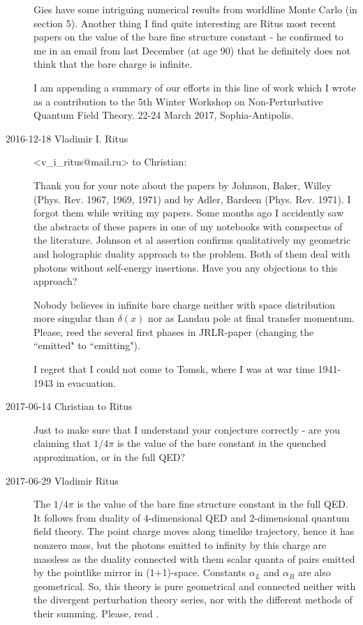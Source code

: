 \begin{description}
\begin{enumerate}
\end{enumerate}
Gies \etal{} have some intriguing numerical results from
worldline Monte Carlo (in section 5). Another thing I find quite
interesting are Ritus most recent
papers on the value of the bare fine
structure constant - he confirmed to me in an email from last December
(at age 90) that he definitely does not think that the bare charge is
infinite.

I am appending a summary of our efforts in this line of work
which I wrote as a contribution to the 5th Winter Workshop on
Non-Perturbative Quantum Field Theory. 22-24 March 2017,
Sophia-Antipolis.

\item[2016-12-18 Vladimir I. Ritus] <v\_i\_ritus@mail.ru>
to Christian:

Thank you for your note about the papers by Johnson, Baker, Willey (Phys.
Rev. 1967, 1969, 1971) and by Adler, Bardeen (Phys. Rev. 1971).
I forgot them while writing my papers. Some months
ago I accidently saw  the abstracts of these papers in one of my
notebooks  with conspectus of the literature. Johnson et al assertion
confirms qualitatively my geometric and holographic duality approach to
the problem. Both of them deal with photons without self-energy
insertions. Have you any objections to this approach?

Nobody believes in infinite bare charge neither with space distribution
more singular than $\delta(x)$ nor as Landau pole at final transfer
momentum. Please, reed the several first phases in JRLR-paper (changing
the ``emitted"  to ``emitting").

I regret that I could not come to Tomsk, where I was at war time
1941-1943 in evacuation.

\item[2017-06-14 Christian to Ritus]
Just to make sure that I understand your conjecture correctly - are you
claiming that $1/4\pi$ is the value of the bare constant in the quenched
approximation, or in the full QED?

\item[2017-06-29 Vladimir Ritus]
The $1/4\pi$  is the value of the bare fine structure constant in the
full QED. It follows from duality of 4-dimensional QED and 2-dimensional
quantum field theory. The point charge moves  along timelike trajectory,
hence it has nonzero mass, but the photons emitted to infinity by this
charge are massless as the duality connected with them scalar quanta of
pairs emitted by the pointlike mirror in (1+1)-space. Constants
$\alpha_L$ and $\alpha_B$ are also geometrical. So, this theory is pure
geometrical and connected neither with the divergent perturbation theory
series, nor with the different methods of their summing. Please, read
.




\end{description}
